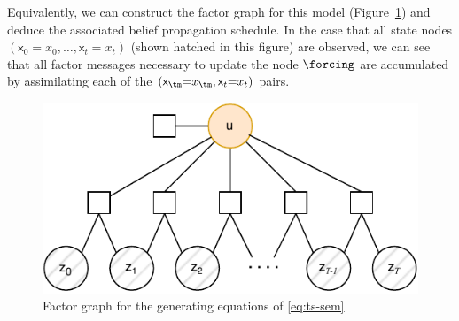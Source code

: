 \documentclass{article}
\newcommand{\rv}[1]{\mathsf{#1}}
\newcommand{\gvn}{\mid}
\newcommand{\state}{\rv{x}}
\newcommand{\statest}{x}
\begin{document}
Equivalently, we can construct the factor graph \citep{KschischangFactor2001,FreyFactor1997} for this model (Figure~\ref{fig:ts_fg}) and deduce the associated belief propagation schedule.
In the case that all state nodes\(\left(\state_{0}{=}\statest_{0},\dots, \state_{t}{=}\statest_{t}\right)\) (shown hatched in this figure) are observed, we can see that all factor messages necessary to update the node \(\forcing\) are accumulated by assimilating each of the \(\left(\state_{\tm}{=}\statest_{\tm}, \state_{t}{=}\statest_{t}\right)\) pairs.

\begin{figure}
    \centering
    \includegraphics{FG_ts.drawio.pdf}
    \caption{Factor graph  for the generating equations of \eqref{eq:ts-sem}}
    \label{fig:ts_fg}
\end{figure}
\end{document}
